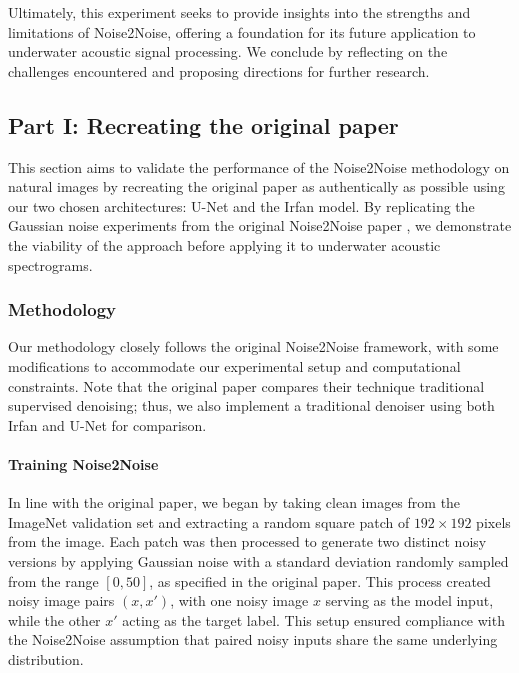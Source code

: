 Ultimately, this experiment seeks to provide insights into the strengths and limitations of Noise2Noise, offering a foundation for its future application to underwater acoustic signal processing. We conclude by reflecting on the challenges encountered and proposing directions for further research.

\subsection{Part I: Recreating the original paper}\label{subsec:recreating-n2n}

This section aims to validate the performance of the Noise2Noise methodology on natural images by recreating the original paper as authentically as possible using our two chosen architectures: U-Net and the Irfan model. By replicating the Gaussian noise experiments from the original Noise2Noise paper \cite{lehtinen_noise2noise_2018}, we demonstrate the viability of the approach before applying it to underwater acoustic spectrograms.

\subsubsection{Methodology}

Our methodology closely follows the original Noise2Noise framework, with some modifications to accommodate our experimental setup and computational constraints. Note that the original paper compares their technique traditional supervised denoising; thus, we also implement a traditional denoiser using both Irfan and U-Net for comparison.

\paragraph{Training Noise2Noise}
In line with the original paper, we began by taking clean images from the ImageNet validation set and extracting a random square patch of $192 \times 192$ pixels from the image. Each patch was then processed to generate two distinct noisy versions by applying Gaussian noise with a standard deviation randomly sampled from the range $[0, 50]$, as specified in the original paper. This process created noisy image pairs $(x, x')$, with one noisy image $x$ serving as the model input, while the other $x'$ acting as the target label. This setup ensured compliance with the Noise2Noise assumption that paired noisy inputs share the same underlying distribution.

